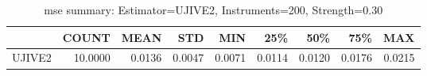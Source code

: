 \begin{table}[ht]
\centering
\caption{mse summary: Estimator=UJIVE2, Instruments=200, Strength=0.30}
\begin{tabular}{lrrrrrrrr}
\toprule
 & COUNT & MEAN & STD & MIN & 25\% & 50\% & 75\% & MAX \\
\midrule
UJIVE2 & 10.0000 & 0.0136 & 0.0047 & 0.0071 & 0.0114 & 0.0120 & 0.0176 & 0.0215 \\
\bottomrule
\end{tabular}
\end{table}
